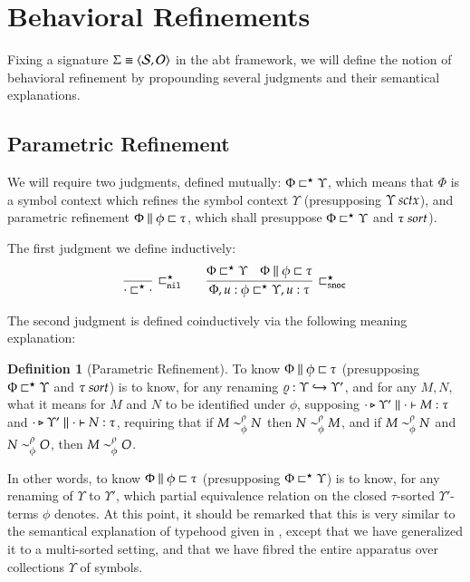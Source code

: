 \documentclass[11pt]{article}
\theoremstyle{definition}
\newtheorem{definition}[thm]{Definition}
\theoremstyle{remark}
\numberwithin{equation}{section}
\def\IModeColorName{MidnightBlue}
\def\OModeColorName{Maroon}
\def\IModeColorName{Black}
\def\OModeColorName{Black}
\newcommand\IMode[1]{{\color{\IModeColorName}{#1}}}
\newcommand\OMode[1]{{\color{\OModeColorName}{#1}}}
\newcommand\Of[2]{\IMode{#1}: \IMode{#2}}
\newcommand\IsSort[1]{\IMode{#1}\ \textit{sort}}
\newcommand\Match[2]{\IMode{#1}\equiv\OMode{#2}}
\newcommand\Sorts{\mathcal{S}}
\newcommand\Operators{\mathcal{O}}
\newcommand\IsSymCtx[1]{\IMode{#1}\ \textit{sctx}}
\newcommand\Pair[2]{\left\langle#1, #2 \right\rangle}
\newcommand\IsAbt[5]{%
  \IMode{#1}\triangleright%
  \IMode{#2}\parallel%
  \IMode{#3}\vdash%
  \IMode{#4}:\OMode{#5}%
}
\newcommand\Refines[3]{\IMode{#1}\parallel \IMode{#2} \sqsubset \OMode{#3}}
\newcommand\RefinesCtx[2]{\IMode{#1}\sqsubset^\star\OMode{#2}}
\begin{document}
\section{Behavioral Refinements}

Fixing a signature $\Match{\Sigma}{\Pair{\Sorts}{\Operators}}$ in the abt
framework, we will define the notion of behavioral refinement by propounding
several judgments and their semantical explanations.

\subsection{Parametric Refinement}

We will require two judgments, defined mutually: $\RefinesCtx{\Phi}{\Upsilon}$,
which means that $\Phi$ is a symbol context which refines the symbol context
$\Upsilon$ (presupposing $\IsSymCtx{\Upsilon}$), and parametric refinement
$\Refines{\Phi}{\phi}{\tau}$, which shall presuppose
$\RefinesCtx{\Phi}{\Upsilon}$ and $\IsSort{\tau}$).

\newcommand\RefinesCtxNil{\sqsubset^\star_{\mathtt{nil}}}
\newcommand\RefinesCtxSnoc{\sqsubset^\star_{\mathtt{snoc}}}

The first judgment we define inductively:
\begin{gather*}
  \infer[\RefinesCtxNil]{
    \RefinesCtx{\cdot}{\cdot}
  }{
  }\qquad
  \infer[\RefinesCtxSnoc]{
    \RefinesCtx{\Phi,u:\phi}{\Upsilon,u:\tau}
  }{
    \RefinesCtx{\Phi}{\Upsilon} &
    \Refines{\Phi}{\phi}{\tau}
  }
\end{gather*}

The second judgment is defined coinductively via the following meaning
explanation:
\begin{definition}[Parametric Refinement]
  To know $\Refines{\Phi}{\phi}{\tau}$ (presupposing
  $\RefinesCtx{\Phi}{\Upsilon}$ and $\IsSort{\tau}$) is to know, for any renaming
  $\Of{\varrho}{\Upsilon\hookrightarrow\OMode{\Upsilon'}}$, and for any $M, N$,
  what it means for $M$ and $N$ to be identified under $\phi$, supposing
  $\IsAbt{\cdot}{\Upsilon'}{\cdot}{M}{\tau}$ and
  $\IsAbt{\cdot}{\Upsilon'}{\cdot}{N}{\tau}$, requiring that if
  $\IMode{M}\sim^\rho_\phi\IMode{N}$ then $\IMode{N}\sim^\rho_\phi\IMode{M}$, and if
  $\IMode{M}\sim^\rho_\phi\IMode{N}$ and $\IMode{N}\sim^\rho_\phi\IMode{O}$, then
  $\IMode{M}\sim^\rho_\phi\IMode{O}$.
\end{definition}

In other words, to know $\Refines{\Phi}{\phi}{\tau}$ (presupposing
$\RefinesCtx{\Phi}{\Upsilon}$) is to know, for any renaming of $\Upsilon$ to
$\Upsilon'$, which partial equivalence relation on the closed $\tau$-sorted
$\Upsilon'$-terms $\phi$ denotes. At this point, it should be remarked that
this is very similar to the semantical explanation of typehood given in
\cite{martin-lof:1979}, except that we have generalized it to a multi-sorted
setting, and that we have fibred the entire apparatus over collections
$\Upsilon$ of symbols.
\end{document}
